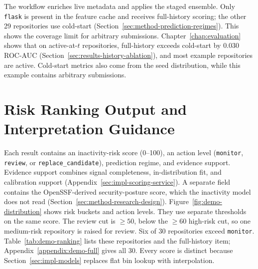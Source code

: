 The workflow enriches live metadata and applies the staged ensemble. Only
\texttt{flask} is present in the feature cache and receives full-history scoring;
the other 29 repositories use cold-start
(Section~\ref{sec:method-prediction-regimes}). This shows the coverage limit for
arbitrary submissions. Chapter~\ref{chap:evaluation} shows that on
active-at-\(t\) repositories, full-history exceeds
cold-start by \(0.030\) ROC-AUC
(Section~\ref{sec:results-history-ablation}), and most example repositories are
active. Cold-start metrics also come from the seed distribution, while this
example contains arbitrary submissions.

\section{Risk Ranking Output and Interpretation Guidance}
\label{sec:demo-ranking}

Each result contains an inactivity-risk score (0--100), an action level
(\texttt{monitor}, \texttt{review}, or \texttt{replace\_candidate}), prediction
regime, and evidence support. Evidence support combines signal completeness,
in-distribution fit, and calibration support
(Appendix~\ref{sec:impl-scoring-service}). A separate field contains the
OpenSSF-derived security-posture score, which the inactivity model does not read
(Section~\ref{sec:method-research-design}).
Figure~\ref{fig:demo-distribution} shows risk buckets and action levels. They use
separate thresholds on the same score. The review cut is \(\geq 50\), below the
\(\geq 60\) high-risk cut, so one medium-risk repository is raised for review.
Six of 30 repositories exceed \texttt{monitor}. Table~\ref{tab:demo-ranking}
lists these repositories and the full-history item; Appendix~\ref{appendix:demo-full}
gives all 30. Every score is distinct because
Section~\ref{sec:impl-models} replaces flat bin lookup with interpolation.

